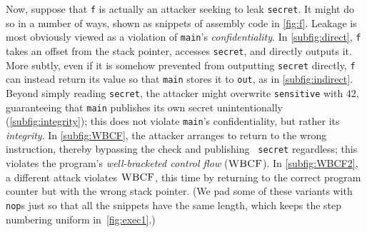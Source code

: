 \documentclass[10pt,conference]{ieeetran}%
\theoremstyle{definition}
\begin{document}
Now, suppose that {\tt f} is actually an attacker seeking
to leak {\tt secret}. It might do so in a number of ways, shown as snippets of
assembly code in \cref{fig:f}.
%
Leakage is most obviously viewed as a violation of {\tt main}'s {\it confidentiality}.
In \cref{subfig:direct}, {\tt f} takes an offset from the stack
pointer, accesses {\tt secret}, and directly outputs it.  More
subtly, even if it is somehow prevented from outputting {\tt secret}
directly, {\tt f}
can instead return its value so that {\tt main} stores it to {\tt out},
as in \cref{subfig:indirect}.
%
Beyond simply reading {\tt secret}, the attacker might overwrite {\tt sensitive}
with 42, guaranteeing that {\tt main} publishes its own secret unintentionally
(\cref{subfig:integrity}); this does not violate {\tt main}'s
confidentiality, but
rather its {\it integrity}.
In \cref{subfig:WBCF}, the attacker arranges to return to the
wrong instruction, thereby bypassing the check and publishing {\tt
  secret} regardless; this
violates the program's {\it well-bracketed control flow} (\(\textnormal{\sc WBCF}\)).
%
In \cref{subfig:WBCF2}, a different attack violates \(\textnormal{\sc WBCF}\), this time
by returning to the correct program counter but with the wrong stack pointer.
%
(We pad some of these variants with {\tt nop}s just so that all the
snippets have the same length, which keeps the step numbering uniform in~\cref{fig:exec1}.)
\end{document}
